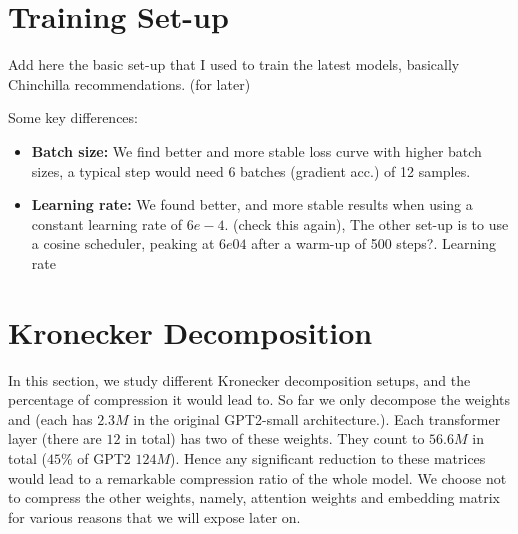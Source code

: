 \documentclass{article}
\begin{document}
\begin{comment}
	grad.sum for :
		1. resuming training for all params for 3k steps.
		2. freezing for 2k, train all for 1k
		3. 1 by 1 training with freezing (at each step, direct flow the flow to origin gpt2) for 2k, the tran all for 1k

	same logic applies in 

We test some interesting properties of distillation. We first position ourselves in a small setup, and then study how these observations scale to larger models. 



\end{comment}




\section{Training Set-up}%
\label{sec:Training setups}

Add here the basic set-up that I used to train the latest models, basically Chinchilla recommendations. (for later)

Some key differences:
\begin{itemize}
	\item \textbf{Batch size:} We find better and more stable loss curve with higher batch sizes, a typical step would need 6 batches (gradient acc.) of 12 samples. 
	\item \textbf{Learning rate:} We found better, and more stable results when using a constant learning rate of $6e-4$. (check this again), The other set-up is to use a cosine scheduler, peaking at $6e04$ after a warm-up of 500 steps?.  Learning rate
\end{itemize}

\section{Kronecker Decomposition}%
\label{sub:Kronecker Decomposition}

In this section, we study different Kronecker decomposition setups, and the percentage of compression it would  lead to. So far we only decompose the weights  and  (each has $2.3M$ in the original GPT2-small architecture.). Each transformer layer (there are $12$ in total) has two of these weights. They count to $56.6M$ in total ($45\%$ of GPT2 $124M$). Hence any significant reduction to these matrices would lead to a remarkable compression ratio of the whole model. We choose not to compress the other weights, namely, attention weights and embedding matrix for various reasons that we will expose later on. 
\end{document}
